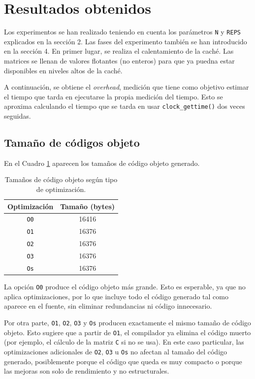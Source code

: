 \documentclass[11pt,a4paper,twoside]{article}
\theoremstyle{definition}
\begin{document}
	
	\section{Resultados obtenidos}
	
	Los experimentos se han realizado teniendo en cuenta los parámetros \texttt{N} y \texttt{REPS} explicados en la sección 2. Las fases del experimento también se han introducido en la sección 4. En primer lugar, se realiza el calentamiento de la caché. Las matrices se llenan de valores flotantes (no enteros) para que ya puedna estar disponibles en niveles altos de la caché. 
	
	A continuación, se obtiene el \textit{overhead}, medición que tiene como objetivo estimar el tiempo que tarda en ejecutarse la propia medición del tiempo. Esto se aproxima calculando el tiempo que se tarda en usar \texttt{clock\_gettime()} dos veces seguidas.
	
	\subsection{Tamaño de códigos objeto}
	
	En el Cuadro \ref{tam} aparecen los tamaños de código objeto generado.
	
	\begin{table} [H] \centering
		\begin{tabular} {| c | c |}
			\hline
			\textbf{Optimización} & \textbf{Tamaño (bytes)} \\
			\hline
			\texttt{O0} & 16416 \\
			\hline
			\texttt{O1} & 16376 \\
			\hline
			\texttt{O2} & 16376 \\
			\hline
			\texttt{O3} & 16376 \\
			\hline
			\texttt{Os} & 16376 \\
			\hline
		\end{tabular}
		\caption{Tamaños de código objeto según tipo de optimización.}
		\label{tam}
	\end{table}

	La opción \texttt{O0} produce el código objeto más grande. Esto es esperable, ya que no aplica optimizaciones, por lo que incluye todo el código generado tal como aparece en el fuente, sin eliminar redundancias ni código innecesario.
	
	Por otra parte, \texttt{O1}, \texttt{O2}, \texttt{O3} y \texttt{Os} producen exactamente el mismo tamaño de código objeto. Esto sugiere que a partir de \texttt{O1}, el compilador ya elimina el código muerto (por ejemplo, el cálculo de la matriz \texttt{C} si no se usa). En este caso particular, las optimizaciones adicionales de \texttt{O2}, \texttt{O3} u \texttt{Os} no afectan al tamaño del código generado, posiblemente porque el código que queda es muy compacto o porque las mejoras son solo de rendimiento y no estructurales.
\end{document}
